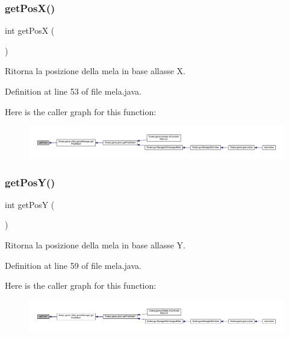 \subsubsection{\texorpdfstring{get\+Pos\+X()}{getPosX()}}
{\footnotesize\ttfamily int get\+PosX (\begin{DoxyParamCaption}{ }\end{DoxyParamCaption})}



Ritorna la posizione della mela in base all\textquotesingle{}asse X. 



Definition at line 53 of file mela.\+java.

Here is the caller graph for this function\+:
\nopagebreak
\begin{figure}[H]
\begin{center}
\leavevmode
\includegraphics[width=350pt]{class_snake_1_1game_1_1vipera_1_1mela_a59a95eee3790a91a574ac018208b6044_icgraph}
\end{center}
\end{figure}
\mbox{\label{class_snake_1_1game_1_1vipera_1_1mela_a3388b2d66cc794258707674f20766a7f}} 
\subsubsection{\texorpdfstring{get\+Pos\+Y()}{getPosY()}}
{\footnotesize\ttfamily int get\+PosY (\begin{DoxyParamCaption}{ }\end{DoxyParamCaption})}



Ritorna la posizione della mela in base all\textquotesingle{}asse Y. 



Definition at line 59 of file mela.\+java.

Here is the caller graph for this function\+:
\nopagebreak
\begin{figure}[H]
\begin{center}
\leavevmode
\includegraphics[width=350pt]{class_snake_1_1game_1_1vipera_1_1mela_a3388b2d66cc794258707674f20766a7f_icgraph}
\end{center}
\end{figure}
\mbox{\label{class_snake_1_1game_1_1vipera_1_1mela_aa5a2e0c6f2b05d50ca35ca417d298363}} 

